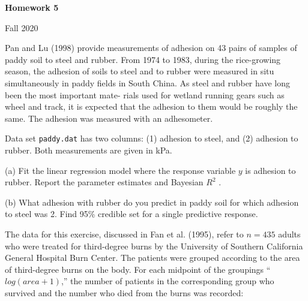 \documentclass[12pt]{article}
\begin{document}
\thispagestyle{empty}
\vspace*{0.5in}
\begin{center}
        { \Large \bf     Homework 5 }
\end{center}

\noindent  Fall 2020


%
%
%
%
%

\vspace{0.3in}
\noindent
{}
Pan and Lu (1998) provide measurements of adhesion on 43 pairs of samples of paddy soil to steel and rubber. From 1974 to 1983, during the rice-growing season, the adhesion of soils to steel and to rubber were measured in situ simultaneously in paddy fields in South China. As steel and rubber have long been the most important mate- rials used for wetland running gears such as wheel and track, it is expected that the adhesion to them would be roughly the same. The adhesion was measured with an adhesometer.

Data set \texttt{paddy.dat} has two columns: (1) adhesion to steel, and (2) adhesion to rubber. Both measurements are given in kPa.

(a) Fit the linear regression model where the response variable $y$ is adhesion to rubber. Report the parameter estimates and Bayesian $R^2$ .

(b) What adhesion with rubber do you predict in paddy soil for which adhesion to steel was 2. Find 95\% credible set for a single predictive response.

 \vspace*{0.3in}
The data for this exercise, discussed in Fan et al. (1995), refer to $n = 435$ adults who were treated for third-degree burns by the University of Southern California General Hospital Burn Center. The patients were grouped according to the area of third-degree burns on the body. For each midpoint of the groupings “$log(area +1)$,” the number of patients in the corresponding group who survived and the number who died from the burns was recorded:
\end{document}
